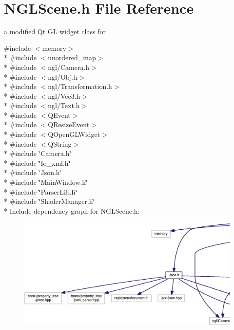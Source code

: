 \section{N\-G\-L\-Scene.\-h File Reference}
\label{_n_g_l_scene_8h}


a modified Qt G\-L widget class for  


{\ttfamily \#include $<$memory$>$}\\*
{\ttfamily \#include $<$unordered\-\_\-map$>$}\\*
{\ttfamily \#include $<$ngl/\-Camera.\-h$>$}\\*
{\ttfamily \#include $<$ngl/\-Obj.\-h$>$}\\*
{\ttfamily \#include $<$ngl/\-Transformation.\-h$>$}\\*
{\ttfamily \#include $<$ngl/\-Vec3.\-h$>$}\\*
{\ttfamily \#include $<$ngl/\-Text.\-h$>$}\\*
{\ttfamily \#include $<$Q\-Event$>$}\\*
{\ttfamily \#include $<$Q\-Resize\-Event$>$}\\*
{\ttfamily \#include $<$Q\-Open\-G\-L\-Widget$>$}\\*
{\ttfamily \#include $<$Q\-String$>$}\\*
{\ttfamily \#include \char`\"{}Camera.\-h\char`\"{}}\\*
{\ttfamily \#include \char`\"{}Io\-\_\-xml.\-h\char`\"{}}\\*
{\ttfamily \#include \char`\"{}Json.\-h\char`\"{}}\\*
{\ttfamily \#include \char`\"{}Main\-Window.\-h\char`\"{}}\\*
{\ttfamily \#include \char`\"{}Parser\-Lib.\-h\char`\"{}}\\*
{\ttfamily \#include \char`\"{}Shader\-Manager.\-h\char`\"{}}\\*
Include dependency graph for N\-G\-L\-Scene.\-h\-:\nopagebreak
\begin{figure}[H]
\begin{center}
\leavevmode
\includegraphics[width=350pt]{_n_g_l_scene_8h__incl}
\end{center}
\end{figure}
